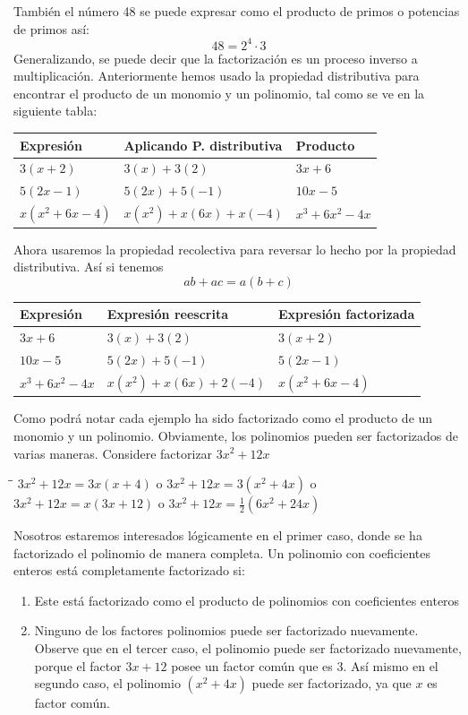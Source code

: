 \documentclass[10pt,twoside]{article}
\begin{document}
También el número 48 se puede expresar como el producto de primos o potencias de primos así:
\[48=2^{4}\cdot 3\]
Generalizando, se puede decir que la factorización es un proceso inverso a multiplicación. Anteriormente hemos usado la propiedad distributiva para encontrar el producto de un monomio y un polinomio, tal como se ve en la siguiente tabla:
\begin{center}
\begin{tabular}{l|l|l}
\hline 
Expresión & Aplicando P. distributiva & Producto \\ \hline
$3(x+2)$ & $3(x)+3(2)$ & $3x+6$ \\ 
$5(2x-1)$ & $5(2x)+5(-1)$ & $10x-5$ \\ 
$x(x^{2}+6x-4)$ & $x(x^{2})+x(6x)+x(-4)$ & $x^{3}+6x^{2}-4x$ \\ 
\hline 
\end{tabular} 
\end{center}
Ahora usaremos la propiedad recolectiva para reversar lo hecho por la propiedad distributiva. Así si tenemos 
\[ab+ac=a(b+c)\]
\begin{center}
\begin{tabular}{l|l|l}
\hline 
Expresión & Expresión reescrita & Expresión factorizada \\ \hline
$3x+6$ & $3(x)+3(2)$ & $3(x+2)$ \\ 
$10x-5$ & $5(2x)+5(-1)$ & $5(2x-1)$ \\ 
$x^{3}+6x^{2}-4x$ & $x(x^{2})+x(6x)+2(-4)$ & $x(x^{2}+6x-4)$ \\ 
\hline 
\end{tabular} 
\end{center}
Como podrá notar cada ejemplo ha sido factorizado como el producto de un monomio y un polinomio. Obviamente, los polinomios pueden ser factorizados de varias maneras. Considere factorizar $3x^{2}+12x$
\begin{tabbing}
\hspace{4cm}\=\hspace{1cm}\=\kill
$3x^{2}+12x=3x(x+4)$ \> o \> $3x^{2}+12x=3(x^{2}+4x)$ \hspace*{1cm} o \\ 
$3x^{2}+12x=x(3x+12)$ \> o \> $3x^{2}+12x=\frac{1}{2}(6x^{2}+24x)$ 
\end{tabbing}
Nosotros estaremos interesados lógicamente en el primer caso, donde se ha factorizado el polinomio de manera completa. Un polinomio con coeficientes enteros está completamente factorizado si:
\begin{enumerate}
\item Este está factorizado como el producto de polinomios con coeficientes enteros
\item Ninguno de los factores polinomios puede ser factorizado nuevamente.
Observe que en el tercer caso, el polinomio puede ser factorizado nuevamente, porque el factor $3x+12$ posee un factor común que es 3. Así mismo en el segundo caso, el polinomio $(x^{2}+4x)$ puede ser factorizado, ya que $x$ es factor común.
\end{enumerate}
\end{document}
